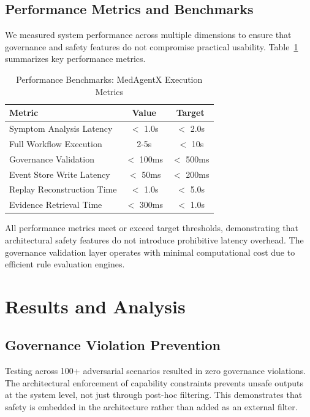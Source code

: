 \documentclass[conference]{IEEEtran}
\begin{document}
\subsection{Performance Metrics and Benchmarks}
We measured system performance across multiple dimensions to ensure that governance and safety features do not compromise practical usability. Table~\ref{tab:performance} summarizes key performance metrics.

\begin{table}[H]
\centering
\caption{Performance Benchmarks: MedAgentX Execution Metrics}
\label{tab:performance}
\small
\begin{tabular}{lcc}
\toprule
\textbf{Metric} & \textbf{Value} & \textbf{Target} \\
\midrule
Symptom Analysis Latency & $<$ 1.0s & $<$ 2.0s \\
Full Workflow Execution & 2-5s & $<$ 10s \\
Governance Validation & $<$ 100ms & $<$ 500ms \\
Event Store Write Latency & $<$ 50ms & $<$ 200ms \\
Replay Reconstruction Time & $<$ 1.0s & $<$ 5.0s \\
Evidence Retrieval Time & $<$ 300ms & $<$ 1.0s \\
\bottomrule
\end{tabular}
\end{table}

All performance metrics meet or exceed target thresholds, demonstrating that architectural safety features do not introduce prohibitive latency overhead. The governance validation layer operates with minimal computational cost due to efficient rule evaluation engines.

\section{Results and Analysis}

\subsection{Governance Violation Prevention}
Testing across 100+ adversarial scenarios resulted in zero governance violations. The architectural enforcement of capability constraints prevents unsafe outputs at the system level, not just through post-hoc filtering. This demonstrates that safety is embedded in the architecture rather than added as an external filter.
\end{document}
